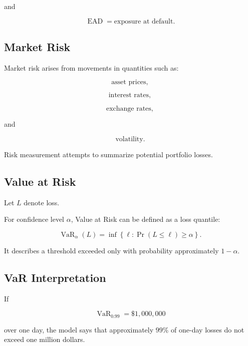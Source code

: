 and

\[
\operatorname{EAD}
=
\text{exposure at default}.
\]

\subsection{Market Risk}
\label{subsec:market-risk}

Market risk arises from movements in quantities such as:

\[
\boxed{
\text{asset prices},
}
\]

\[
\boxed{
\text{interest rates},
}
\]

\[
\boxed{
\text{exchange rates},
}
\]

and

\[
\boxed{
\text{volatility}.
}
\]

Risk measurement attempts to summarize potential portfolio losses.

\subsection{Value at Risk}
\label{subsec:value-at-risk-finance}

Let \(L\) denote loss.

For confidence level \(\alpha\), Value at Risk can be defined as a loss
quantile:

\[
\boxed{
\operatorname{VaR}_{\alpha}(L)
=
\inf
\left\{
\ell:
\Pr(L\leq\ell)\geq\alpha
\right\}.
}
\]

It describes a threshold exceeded only with probability approximately
\(1-\alpha\).

\subsection{VaR Interpretation}
\label{subsec:var-interpretation-finance}

If

\[
\operatorname{VaR}_{0.99}
=
\$1{,}000{,}000
\]

over one day, the model says that approximately \(99\%\) of one-day losses
do not exceed one million dollars.

